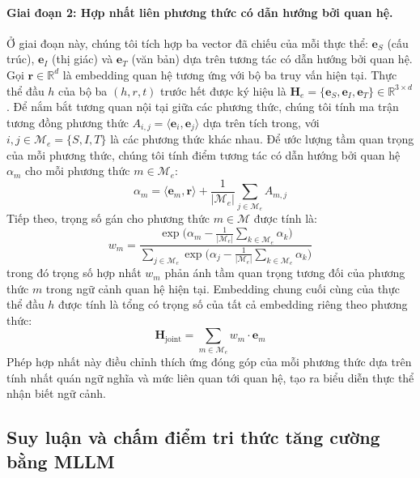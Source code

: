 \documentclass[10pt,twocolumn,a4paper]{article}
\newcommand{\Hj}{\mathbf{H}_{\mathrm{joint}}}
\begin{document}
\paragraph{Giai đoạn 2: Hợp nhất liên phương thức có dẫn hướng bởi quan hệ.}
Ở giai đoạn này, chúng tôi tích hợp ba vector đã chiếu của mỗi thực thể: $\mathbf{e}_S$ (cấu trúc), $\mathbf{e}_I$ (thị giác) và $\mathbf{e}_T$ (văn bản) dựa trên tương tác có dẫn hướng bởi quan hệ. Gọi $\mathbf{r} \in \mathbb{R}^d$ là embedding quan hệ tương ứng với bộ ba truy vấn hiện tại. Thực thể đầu $h$ của bộ ba $(h, r, t)$ trước hết được ký hiệu là $\mathbf{H}_e = \{\mathbf{e}_S, \mathbf{e}_I, \mathbf{e}_T\} \in \mathbb{R}^{3\times d}$. Để nắm bắt tương quan nội tại giữa các phương thức, chúng tôi tính ma trận tương đồng phương thức $A_{i,j} = \langle \mathbf{e}_i, \mathbf{e}_j\rangle$ dựa trên tích trong, với $i, j \in \mathcal{M}_e = \{S, I, T\}$ là các phương thức khác nhau. Để ước lượng tầm quan trọng của mỗi phương thức, chúng tôi tính điểm tương tác có dẫn hướng bởi quan hệ $\alpha_m$ cho mỗi phương thức $m \in \mathcal{M}_e$:
\begin{equation}
\alpha_m = \langle \mathbf{e}_m, \mathbf{r}\rangle + \frac{1}{|\mathcal{M}_e|}\sum_{j\in\mathcal{M}_e} A_{m,j}
\label{eq:2}
\end{equation}
Tiếp theo, trọng số gán cho phương thức $m \in \mathcal{M}$ được tính là:
\begin{equation}
w_m = \frac{\exp\!\Big(\alpha_m - \frac{1}{|\mathcal{M}_e|}\sum_{k\in\mathcal{M}_e}\alpha_k\Big)}{\sum_{j\in\mathcal{M}_e}\exp\!\Big(\alpha_j - \frac{1}{|\mathcal{M}_e|}\sum_{k\in\mathcal{M}_e}\alpha_k\Big)}
\label{eq:3}
\end{equation}
trong đó trọng số hợp nhất $w_m$ phản ánh tầm quan trọng tương đối của phương thức $m$ trong ngữ cảnh quan hệ hiện tại. Embedding chung cuối cùng của thực thể đầu $h$ được tính là tổng có trọng số của tất cả embedding riêng theo phương thức:
\begin{equation}
\Hj = \sum_{m\in\mathcal{M}_e} w_m \cdot \mathbf{e}_m
\label{eq:4}
\end{equation}
Phép hợp nhất này điều chỉnh thích ứng đóng góp của mỗi phương thức dựa trên tính nhất quán ngữ nghĩa và mức liên quan tới quan hệ, tạo ra biểu diễn thực thể nhận biết ngữ cảnh.

\subsection{Suy luận và chấm điểm tri thức tăng cường bằng MLLM}
\end{document}
